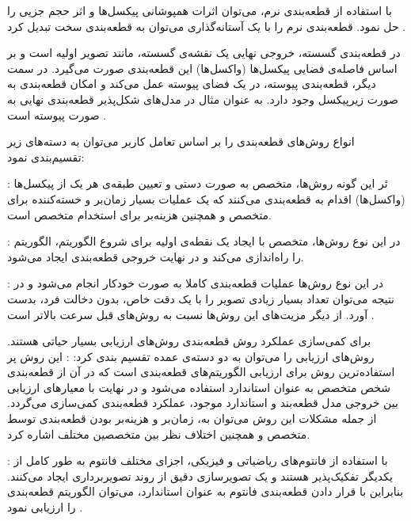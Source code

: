 با استفاده از قطعه‌بندی نرم، می‌توان اثرات همپوشانی پیکسل‌ها و اثر حجم جزیی را حل نمود. قطعه‌بندی نرم را با یک آستانه‌گذاری می‌توان به قطعه‌بندی سخت تبدیل کرد .

در قطعه‌بندی گسسته، خروجی نهایی یک نقشه‌ی گسسته، مانند تصویر اولیه است و بر اساس فاصله‌ی فضایی پیکسل‌ها (واکسل‌ها) این قطعه‌بندی صورت می‌گیرد. در سمت دیگر، قطعه‌بندی پیوسته، در یک فضای پیوسته عمل می‌کند و امکان قطعه‌بندی به صورت زیرپیکسل وجود دارد. به عنوان مثال در مدل‌های شکل‌پذیر قطعه‌بندی نهایی به صورت پیوسته است .

انواع روش‌های قطعه‌بندی را بر اساس تعامل کاربر می‌توان به دسته‌های زیر تقسیم‌بندی نمود:
 
 : ئر این گونه روش‌ها، متخصص به صورت دستی و تعیین طبقه‌ی هر یک از پیکسل‌ها (واکسل‌ها) اقدام به قطعه‌بندی می‌کنند که یک عملیات بسیار زمان‌بر و خسته‌کننده برای متخصص و همچنین هزینه‌بر برای استخدام متخصص است.

 : در این نوع روش‌ها، متخصص با ایجاد یک نقطه‌ی اولیه برای شروع الگوریتم، الگوریتم را راه‌اندازی می‌کند و در نهایت خروجی قطعه‌بندی ایجاد می‌شود. 

 : در این نوع روش‌ها عملیات قطعه‌بندی کاملا به‌ صورت خودکار انجام می‌شود و در نتیجه می‌توان تعداد بسیار زیادی تصویر را با یک دقت خاص، بدون دخالت فرد، بدست آورد. از دیگر مزیت‌های این روش‌ها نسبت به روش‌های قبل سرعت بالاتر است .


برای کمی‌سازی عملکرد روش قطعه‌بندی روش‌های ارزیابی بسیار حیاتی هستند. روش‌های ارزیابی را می‌توان به دو دسته‌ی عمده تقسیم بندی کرد: 
 : این روش پر استفاده‌ترین روش برای ارزیابی الگوریتم‌های قطعه‌بندی است که در آن از قطعه‌بندی شخص متخصص به عنوان استاندارد استفاده می‌شود و در نهایت با معیارهای ارزیابی بین خروجی مدل قطعه‌بند و استاندارد موجود، عملکرد قطعه‌بندی کمی‌سازی می‌گردد. از جمله مشکلات این روش می‌توان به، زمان‌بر و هزینه‌بر بودن قطعه‌بندی توسط متخصص و همچنین اختلاف نظر بین متخصصین مختلف اشاره کرد.

 : با استفاده از فانتوم‌های ریاضیاتی و فیزیکی، اجزای مختلف فانتوم به طور کامل از یکدیگر تفکیک‌پذیر هستند و یک تصویرسازی دقیق از روند تصویربرداری ایجاد می‌کنند. بنابراین با قرار دادن قطعه‌بندی فانتوم به عنوان استاندارد، می‌توان الگوریتم قطعه‌بندی را ارزیابی نمود .


